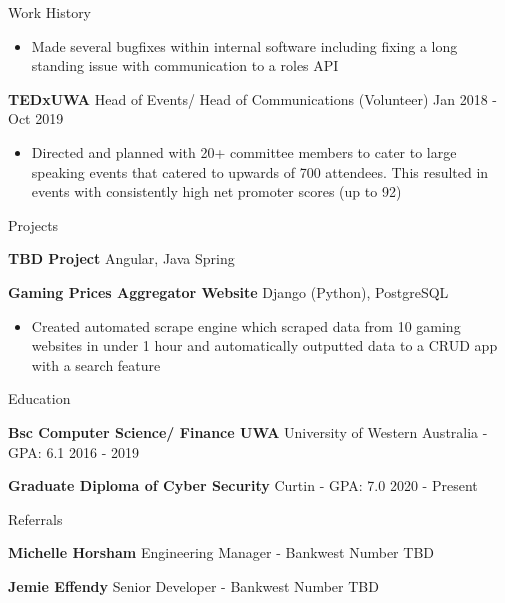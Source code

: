 \documentclass{resume} %
\begin{document}
\begin{rSection}{Work History}
\begin{itemize}
			\item Made several bugfixes within internal software including fixing a long standing issue with communication to a roles API
		\end{itemize}
		\item \textbf{TEDxUWA} {Head of Events/ Head of Communications} (Volunteer) \hfill Jan 2018 - Oct 2019
		\begin{itemize} 
			\item Directed and planned with 20+ committee members to cater to large speaking events that catered to upwards of 700 attendees. This resulted in events with consistently high net promoter scores (up to 92)  
		\end{itemize}
	\end{rSection} 
	
	\begin{rSection}{Projects}
		\vspace{-1.25em}
		\item \textbf{TBD Project} {Angular, Java Spring}
		\item \textbf{Gaming Prices Aggregator Website} {Django (Python), PostgreSQL} 
		\begin{itemize} 
			\item Created automated scrape engine which scraped data from 10 gaming websites in under 1 hour and automatically outputted data to a CRUD app with a search feature
		\end{itemize}
	\end{rSection} 
	
	\begin{rSection}{Education}
		\vspace{-1.25em}
		\item \textbf{Bsc Computer Science/ Finance UWA} {University of Western Australia} - GPA: 6.1 \hfill 2016 - 2019
		\item \textbf{Graduate Diploma of Cyber Security} {Curtin} - GPA: 7.0 \hfill 2020 - Present
	\end{rSection} 
	
	\begin{rSection}{Referrals} 
		\vspace{-1.25em}
		\item \textbf{Michelle Horsham} {Engineering Manager - Bankwest} \hfill Number TBD
		
		\item \textbf{Jemie Effendy} {Senior Developer - Bankwest} \hfill Number TBD
	\end{rSection}
\end{document}

